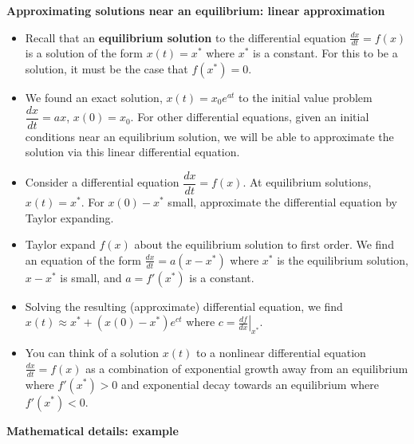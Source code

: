 \documentclass[12pt,letterpaper,noanswers]{exam}
\begin{document}
\noindent\textbf{Approximating solutions near an equilibrium: linear approximation}
\begin{tcolorbox}
\begin{itemize}
   
    \item Recall that an \textbf{equilibrium solution} to the differential equation $\frac{dx}{dt} = f(x)$ is a solution of the form $x(t) = x^*$ where $x^*$ is a constant.  For this to be a solution, it must be the case that $f(x^*) = 0$.
\end{itemize}

\end{tcolorbox}
\begin{tcolorbox}
\begin{itemize}
\itemsep0em
 \item We found an exact solution, $x(t) = x_0e^{at}$ to the initial value problem $\dfrac{dx}{dt} = ax$, $x(0) = x_0$.  For other differential equations, given an initial conditions near an equilibrium solution, we will be able to approximate the solution via this linear differential equation.
    \item Consider a differential equation $\dfrac{dx}{dt} = f(x)$.  At equilibrium solutions, $x(t) = x^*$.  For $x(0) - x^*$ small, approximate the differential equation by Taylor expanding.
    \item Taylor expand $f(x)$ about the equilibrium solution to first order.  We find an equation of the form $\frac{dx}{dt} = a(x-x^*)$ where $x^*$ is the equilibrium solution, $x-x^*$ is small, and $a = f'(x^*)$ is a constant. 
    \item Solving the resulting (approximate) differential equation, we find $x(t) \approx x^* + (x(0)-x^*)e^{ct}$ where $c = \left.\frac{df}{dx}\right\vert_{x^*}$.
    \item You can think of a solution $x(t)$ to a nonlinear differential equation $\frac{dx}{dt} = f(x)$ as a combination of exponential growth away from an equilibrium where $f'(x^*)>0$ and exponential decay towards an equilibrium where $f'(x^*)<0$.
\end{itemize}
\end{tcolorbox}
\noindent\textbf{Mathematical details: example}
\end{document}
